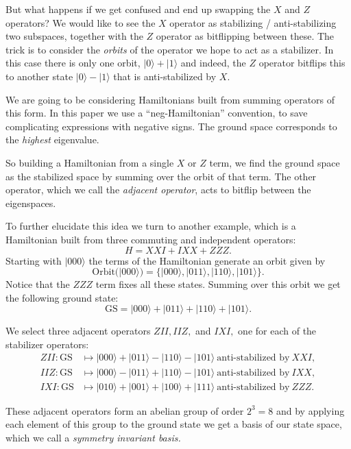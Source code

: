 \documentclass[a4paper,onecolumn,11pt,unpublished]{quantumarticle}
\def\Ham{H}
\newcommand{\ket}[1]{|{#1}\rangle}
\newcommand\doexample[1]{\vskip 5pt \noindent {\bf \underline{Example #1.}\ }}
\newcommand\tombstone{\qedsymbol\vskip 5pt}
\newcounter{numitem}
\newcommand{\numitem}[1]{\refstepcounter{numitem}\thenumitem\label{#1}}
\begin{document}
But what happens if we get confused and end up swapping
the $X$ and $Z$ operators? We would like to see the $X$ operator
as stabilizing / anti-stabilizing two subspaces, together with the
$Z$ operator as bitflipping between these.
The trick is to consider the \emph{orbits} of the operator
we hope to act as a stabilizer.
In this case there is only one orbit, $\ket{0}+\ket{1}$
and indeed, the $Z$ operator bitflips this to another state
$\ket{0}-\ket{1}$ that is anti-stabilized by $X.$
\tombstone

We are going to be considering Hamiltonians built from
summing operators of this form.
In this paper we use a ``neg-Hamiltonian'' convention,
to save complicating expressions with negative signs.
The ground space corresponds to the \emph{highest} eigenvalue.

So building a Hamiltonian from a single $X$ or $Z$ term,
we find the ground space as the stabilized space
by summing over the orbit of that term.
The other operator,
which we call the \emph{adjacent operator}, acts to bitflip
between the eigenspaces.

\doexample{\numitem{Ex2}}
To further elucidate this idea we turn to another example,
which is a Hamiltonian built from three commuting and
independent operators:
$$
    \Ham = XXI + IXX + ZZZ.
$$
Starting with $\ket{000}$
the terms of the Hamiltonian generate an orbit
given by $$\mathrm{Orbit}(\ket{000}) = \{\ket{000}, \ket{011}, \ket{110}, \ket{101}\}.$$
Notice that the $ZZZ$ term fixes all these states.
Summing over this orbit we get the following ground state:
$$\mathrm{GS} = \ket{000}+\ket{011}+\ket{110}+\ket{101}.$$

We select three adjacent operators
$ZII, IIZ,$ and $IXI,$
one for each of the stabilizer operators:
\begin{align*}
    ZII : \mbox{GS} &\mapsto \ket{000}+\ket{011}-\ket{110}-\ket{101} 
        \ \mbox{anti-stabilized by}\  XXI,\\
    IIZ : \mbox{GS} &\mapsto \ket{000}-\ket{011}+\ket{110}-\ket{101} 
        \ \mbox{anti-stabilized by}\  IXX,\\
    IXI : \mbox{GS} &\mapsto \ket{010}+\ket{001}+\ket{100}+\ket{111} 
        \ \mbox{anti-stabilized by}\  ZZZ.
\end{align*}

These adjacent operators form an abelian group
of order $2^3 = 8$ and by applying each element of
this group to the ground state we get a basis
of our state space, which we call a \emph{symmetry
invariant basis.}
\end{document}
